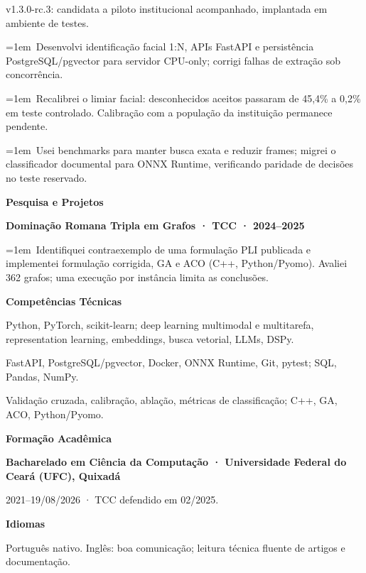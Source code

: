 \documentclass[a4paper,10pt]{article}
\begin{document}
v1.3.0-rc.3: candidata a piloto institucional acompanhado, implantada em ambiente de testes.\par
\hangindent=1em\textbullet\ Desenvolvi identificação facial 1:N, APIs FastAPI e persistência PostgreSQL/pgvector para servidor CPU-only; corrigi falhas de extração sob concorrência.\par
\hangindent=1em\textbullet\ Recalibrei o limiar facial: desconhecidos aceitos passaram de 45,4\% a 0,2\% em teste controlado. Calibração com a população da instituição permanece pendente.\par
\hangindent=1em\textbullet\ Usei benchmarks para manter busca exata e reduzir frames; migrei o classificador documental para ONNX Runtime, verificando paridade de decisões no teste reservado.\par
\vspace{5pt}\textbf{Pesquisa e Projetos}\par
\textbf{Dominação Romana Tripla em Grafos · TCC · 2024–2025}\par
\hangindent=1em\textbullet\ Identifiquei contraexemplo de uma formulação PLI publicada e implementei formulação corrigida, GA e ACO (C++, Python/Pyomo). Avaliei 362 grafos; uma execução por instância limita as conclusões.\par
\vspace{5pt}\textbf{Competências Técnicas}\par
Python, PyTorch, scikit-learn; deep learning multimodal e multitarefa, representation learning, embeddings, busca vetorial, LLMs, DSPy.\par
FastAPI, PostgreSQL/pgvector, Docker, ONNX Runtime, Git, pytest; SQL, Pandas, NumPy.\par
Validação cruzada, calibração, ablação, métricas de classificação; C++, GA, ACO, Python/Pyomo.\par
\vspace{5pt}\textbf{Formação Acadêmica}\par
\textbf{Bacharelado em Ciência da Computação · Universidade Federal do Ceará (UFC), Quixadá}\par
2021–19/08/2026 · TCC defendido em 02/2025.\par
\vspace{5pt}\textbf{Idiomas}\par
Português nativo. Inglês: boa comunicação; leitura técnica fluente de artigos e documentação.\par
\end{document}

